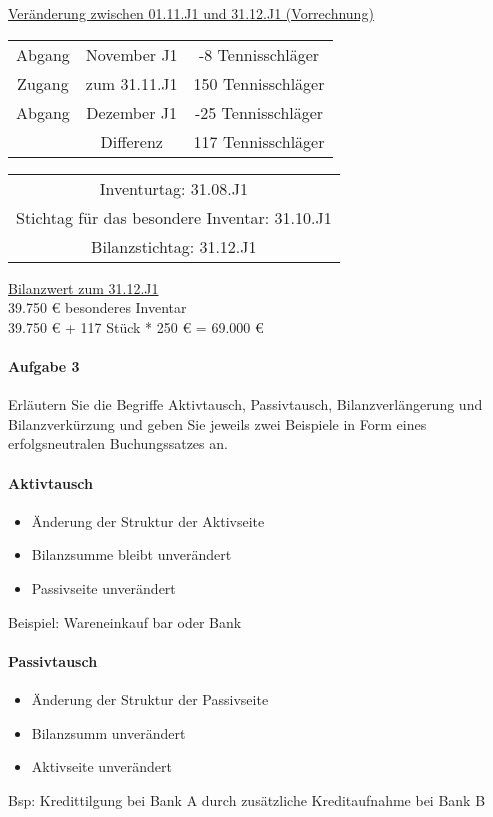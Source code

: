 \documentclass[paper=a4, fontsize=11pt]{scrartcl}
\numberwithin{equation}{section}
\numberwithin{figure}{section}
\numberwithin{table}{section}
\begin{document}
\begin{itemize}
\underline{Veränderung zwischen 01.11.J1 und 31.12.J1 (Vorrechnung)} \\
\begin{tabular}{cc|c}
Abgang & November J1 & -8 Tennisschläger \\
Zugang & zum 31.11.J1 & 150 Tennisschläger \\
Abgang & Dezember J1 & -25 Tennisschläger \\\hline
 & Differenz & 117 Tennisschläger 
\end{tabular}

\begin{tabular}{|c|}
\hline
Inventurtag: 31.08.J1 \\
Stichtag für das besondere Inventar: 31.10.J1 \\
Bilanzstichtag: 31.12.J1 \\
\hline
\end{tabular}

\underline{Bilanzwert zum 31.12.J1} \\
39.750 € besonderes Inventar \\
39.750 € + 117 Stück * 250 € = 69.000 €
\end{itemize}
\paragraph{Aufgabe 3}
Erläutern Sie die Begriffe Aktivtausch, Passivtausch, Bilanzverlängerung und Bilanzverkürzung und geben Sie jeweils zwei Beispiele in Form eines erfolgsneutralen Buchungssatzes an. \\

\paragraph{Aktivtausch}
\begin{itemize}
\item Änderung der Struktur der Aktivseite
\item Bilanzsumme bleibt unverändert
\item Passivseite unverändert
\end{itemize}
Beispiel: Wareneinkauf bar oder Bank
\paragraph{Passivtausch}
\begin{itemize}
\item Änderung der Struktur der Passivseite
\item Bilanzsumm unverändert
\item Aktivseite unverändert
\end{itemize}
Bsp: Kredittilgung bei Bank A durch zusätzliche Kreditaufnahme bei Bank B
\end{document}
